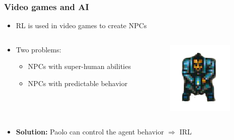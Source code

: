\begin{frame}
\frametitle{Video games and AI}

	\begin{itemize}
		\item RL is used in video games to create NPCs
	\end{itemize}
	
	
	\begin{columns}
		\begin{column}{0.5\textwidth}
			
			\begin{itemize}
				\item Two problems:
				
				\begin{itemize}
					\item NPCs with super-human abilities
					\item NPCs with predictable behavior
				\end{itemize}
				
			\end{itemize}
			
		\end{column}
		\begin{column}{0.5\textwidth}
			\centering
			\includegraphics[width=0.4\linewidth]{images/npc2.png}		
		\end{column}
		
	\end{columns}
	
	\vspace{0.5cm}
	
	\begin{itemize}
		\item<2-> \textbf{Solution:} Paolo can control the agent behavior $\Rightarrow$ IRL %
	\end{itemize}

\end{frame}

